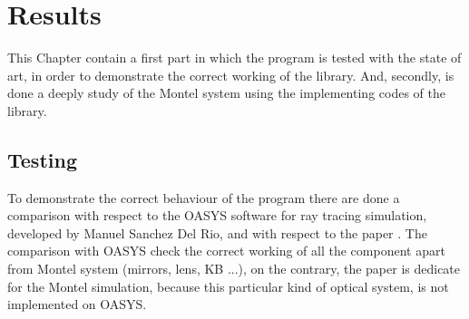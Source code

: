 \chapter{Results}
\label{capitolo4}

This Chapter contain a first part in which the program is tested with the state of art, in order to demonstrate the correct working of the library. And, secondly, is done a deeply study of the Montel system using the implementing codes of the library.
\vspace{0.5cm}
\section{Testing}
To demonstrate the correct behaviour of the program there are done a comparison  with respect to the OASYS software for ray tracing simulation, developed by Manuel Sanchez Del Rio, and with respect to the  paper \cite{resta2015nested}. The comparison with OASYS check the correct working of all the component apart from Montel system (mirrors, lens, KB ...), on the contrary, the paper is dedicate for the Montel simulation, because this particular kind of optical system, is not implemented on OASYS.
%
